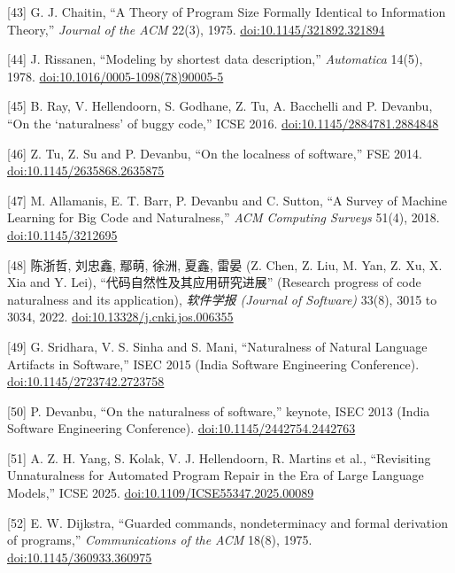 \documentclass[10pt,letterpaper]{article}
\begin{document}
{[}43{]} G. J. Chaitin, ``A Theory of Program Size Formally Identical to
Information Theory,'' \emph{Journal of the ACM} 22(3), 1975.
\href{https://doi.org/10.1145/321892.321894}{doi:10.1145/321892.321894}

{[}44{]} J. Rissanen, ``Modeling by shortest data description,''
\emph{Automatica} 14(5), 1978.
\href{https://doi.org/10.1016/0005-1098(78)90005-5}{doi:10.1016/0005-1098(78)90005-5}

{[}45{]} B. Ray, V. Hellendoorn, S. Godhane, Z. Tu, A. Bacchelli and P.
Devanbu, ``On the `naturalness' of buggy code,'' ICSE 2016.
\href{https://doi.org/10.1145/2884781.2884848}{doi:10.1145/2884781.2884848}

{[}46{]} Z. Tu, Z. Su and P. Devanbu, ``On the localness of software,''
FSE 2014.
\href{https://doi.org/10.1145/2635868.2635875}{doi:10.1145/2635868.2635875}

{[}47{]} M. Allamanis, E. T. Barr, P. Devanbu and C. Sutton, ``A Survey
of Machine Learning for Big Code and Naturalness,'' \emph{ACM Computing
Surveys} 51(4), 2018.
\href{https://doi.org/10.1145/3212695}{doi:10.1145/3212695}

{[}48{]} 陈浙哲, 刘忠鑫, 鄢萌, 徐洲, 夏鑫, 雷晏 (Z. Chen, Z. Liu, M.
Yan, Z. Xu, X. Xia and Y. Lei), ``代码自然性及其应用研究进展'' (Research
progress of code naturalness and its application), \emph{软件学报
(Journal of Software)} 33(8), 3015 to 3034, 2022.
\href{https://doi.org/10.13328/j.cnki.jos.006355}{doi:10.13328/j.cnki.jos.006355}

{[}49{]} G. Sridhara, V. S. Sinha and S. Mani, ``Naturalness of Natural
Language Artifacts in Software,'' ISEC 2015 (India Software Engineering
Conference).
\href{https://doi.org/10.1145/2723742.2723758}{doi:10.1145/2723742.2723758}

{[}50{]} P. Devanbu, ``On the naturalness of software,'' keynote, ISEC
2013 (India Software Engineering Conference).
\href{https://doi.org/10.1145/2442754.2442763}{doi:10.1145/2442754.2442763}

{[}51{]} A. Z. H. Yang, S. Kolak, V. J. Hellendoorn, R. Martins et al.,
``Revisiting Unnaturalness for Automated Program Repair in the Era of
Large Language Models,'' ICSE 2025.
\href{https://doi.org/10.1109/ICSE55347.2025.00089}{doi:10.1109/ICSE55347.2025.00089}

{[}52{]} E. W. Dijkstra, ``Guarded commands, nondeterminacy and formal
derivation of programs,'' \emph{Communications of the ACM} 18(8), 1975.
\href{https://doi.org/10.1145/360933.360975}{doi:10.1145/360933.360975}
\end{document}
